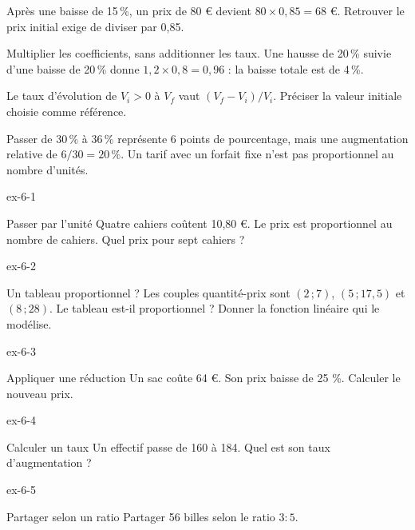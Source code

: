 \begin{exemple}Après une baisse de 15\,\%, un prix de 80 € devient $80\times0{,}85=68$ €. Retrouver le prix initial exige de diviser par 0,85.\end{exemple}
\begin{savoirfaire}Multiplier les coefficients, sans additionner les taux. Une hausse de 20\,\% suivie d’une baisse de 20\,\% donne $1{,}2\times0{,}8=0{,}96$ : la baisse totale est de 4\,\%.\end{savoirfaire}
\begin{propriete}Le taux d’évolution de $V_i>0$ à $V_f$ vaut $(V_f-V_i)/V_i$. Préciser la valeur initiale choisie comme référence.\end{propriete}
\begin{attention}Passer de 30\,\% à 36\,\% représente 6 points de pourcentage, mais une augmentation relative de $6/30=20\,\%$. Un tarif avec un forfait fixe n’est pas proportionnel au nombre d’unités.\end{attention}
\clearpage{}
\begin{blocLivre}{ex-6-1}\begin{exercice}[1]{Passer par l’unité}
Quatre cahiers coûtent 10,80 €. Le prix est proportionnel au nombre de cahiers. Quel prix pour sept cahiers ?
\end{exercice}\end{blocLivre}
\begin{blocLivre}{ex-6-2}\begin{exercice}[1]{Un tableau proportionnel ?}
Les couples quantité-prix sont $(2\,;7)$, $(5\,;17{,}5)$ et $(8\,;28)$. Le tableau est-il proportionnel ? Donner la fonction linéaire qui le modélise.
\end{exercice}\end{blocLivre}
\begin{blocLivre}{ex-6-3}\begin{exercice}[1]{Appliquer une réduction}
Un sac coûte 64 €. Son prix baisse de 25 \%. Calculer le nouveau prix.
\end{exercice}\end{blocLivre}
\begin{blocLivre}{ex-6-4}\begin{exercice}[1]{Calculer un taux}
Un effectif passe de 160 à 184. Quel est son taux d’augmentation ?
\end{exercice}\end{blocLivre}
\begin{blocLivre}{ex-6-5}\begin{exercice}[1]{Partager selon un ratio}
Partager 56 billes selon le ratio $3:5$.
\end{exercice}\end{blocLivre}

